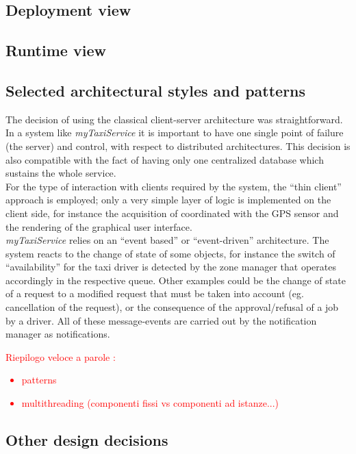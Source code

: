 \documentclass[a4paper,11pt]{report} %
\newcommand{\mts}{\mbox{\normalfont\itshape myTaxiService}}
\begin{document}
	
	\subsection{Deployment view}
	
	\subsection{Runtime view}
	
	\subsection{Selected architectural styles and patterns}

	The decision of using the classical client-server architecture was straightforward. In a system like \mts{} it is important to have one single point of failure (the server) and control, with respect to distributed architectures. This decision is also compatible with the fact of having only one centralized database which sustains the whole service.\\
	For the type of interaction with clients required by the system, the ``thin client'' approach is employed; only a very simple layer of logic is implemented on the client side, for instance the acquisition of coordinated with the GPS sensor and the rendering of the graphical user interface.\\
	\mts{} relies on an ``event based'' or ``event-driven'' architecture. The system reacts to the change of state of some objects, for instance the switch of ``availability'' for the taxi driver is detected by the zone manager that operates accordingly in the respective queue. Other examples could be the change of state of a request to a modified request that must be taken into account (eg. cancellation of the request), or the consequence of the approval/refusal of a job by a driver. All of these message-events are carried out by the notification manager as notifications.\\
	\textcolor{red}{Riepilogo veloce a parole :\begin{itemize}
			\item patterns
			\item multithreading (componenti fissi vs componenti ad istanze...)
		\end{itemize}}	
	
	\subsection{Other design decisions}
\end{document}

